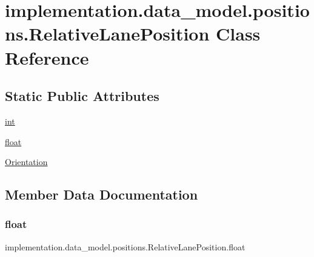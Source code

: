 \hypertarget{classimplementation_1_1data__model_1_1positions_1_1_relative_lane_position}{}\section{implementation.\+data\+\_\+model.\+positions.\+Relative\+Lane\+Position Class Reference}
\label{classimplementation_1_1data__model_1_1positions_1_1_relative_lane_position}
\subsection*{Static Public Attributes}
\begin{DoxyCompactItemize}
\item 
\hyperlink{classimplementation_1_1data__model_1_1positions_1_1_relative_lane_position_a44fb19dd037d4b1743a7d3ebf7ff07ef}{int}
\item 
\hyperlink{classimplementation_1_1data__model_1_1positions_1_1_relative_lane_position_a63129d10d9e66572aee5771ea13047db}{float}
\item 
\hyperlink{classimplementation_1_1data__model_1_1positions_1_1_relative_lane_position_a7ee3505d5a706ac45044054563a7477e}{Orientation}
\end{DoxyCompactItemize}


\subsection{Member Data Documentation}
\mbox{\label{classimplementation_1_1data__model_1_1positions_1_1_relative_lane_position_a63129d10d9e66572aee5771ea13047db}} 
\subsubsection{\texorpdfstring{float}{float}}
{\footnotesize\ttfamily implementation.\+data\+\_\+model.\+positions.\+Relative\+Lane\+Position.\+float\hspace{0.3cm}{\ttfamily [static]}}

